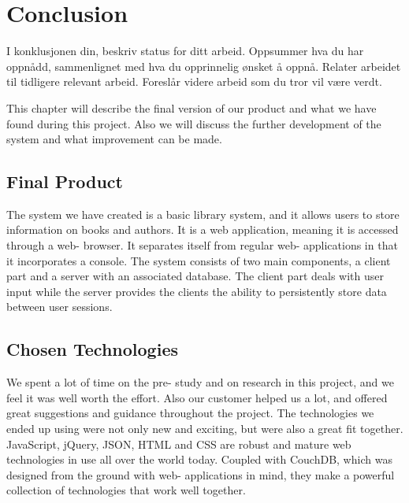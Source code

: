 
\chapter{Conclusion}

\minitoc

I konklusjonen din, beskriv status for ditt arbeid.
Oppsummer hva du har oppnådd, sammenlignet
med hva du opprinnelig ønsket å oppnå. Relater
arbeidet til tidligere relevant arbeid. Foreslår videre
arbeid som du tror vil være verdt.


This chapter will describe the final version of our product and what we have found during this project. Also we will discuss the further development of the system and what improvement can be made.

\clearpage

\section{Final Product}
The system we have created is a basic library system, and it allows users to store information on books and authors. It is a web application, meaning it is accessed through a web- browser. It separates itself from regular web- applications in that it incorporates a console. The system consists of two main components, a client part and a server with an associated database. The client part deals with user input while the server provides the clients the ability to persistently store data between user sessions.



\section{Chosen Technologies}
We spent a lot of time on the pre- study and on research in this project, and we feel it was well worth the effort. Also our customer helped us a lot, and offered great suggestions and guidance throughout the project. The technologies we ended up using were not only new and exciting, but were also a great fit together. JavaScript, jQuery, JSON, HTML and CSS are robust and mature web technologies in use all over the world today. Coupled with CouchDB, which was designed from the ground with web- applications in mind, they make a powerful collection of technologies that work well together.

